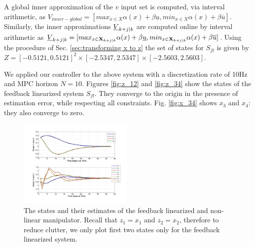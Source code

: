 A global inner approximation of the $v$ input set is computed, via interval arithmetic, as $V_{inner-global} = [max_{x\in X}\alpha(x) + \beta \underline{u}, min_{x\in X}\alpha(x) + \beta \overline{u}]$. 
Similarly, the inner approximations $\underline{V}_{k+j|k}$ are computed online by interval arithmetic as $\underline{V}_{k+j|k} = [max_{x\in \mathbf{X}_{k+j|k}} \alpha(x) + \beta \underline{u},  min_{x\in \mathbf{X}_{k+j|k}}\alpha(x) + \beta \overline{u}]$. 
Using the procedure of Sec. \ref{sec:transforming x to z} the set of states for $S_{fl}$ is given by $Z = [-0.5121, 0.5121]^2 \times [-2.5347, 2.5347] \times [-2.5603, 2.5603]$.

We applied our controller to the above system with a discretization rate of 10Hz and MPC horizon $N=10$.
Figures \ref{fig:z_12} and \ref{fig:z_34} show the states of the feedback linearized system $S_{fl}$. 
They converge to the origin in the presence of estimation error, while respecting all constraints.
Fig. \ref{fig:x_34} shows $x_3$ and $x_4$: they also converge to zero.

\begin{figure}
\includegraphics[width=0.49\textwidth]{figs/AllStates_manip.pdf}
\caption{The states and their estimates of the feedback linearized and non-linear manipulator. Recall that $z_1 = x_1$ and $z_2=x_2$, therefore to reduce clutter, we only plot first two states only for the feedback linearized system.}
\label{fig:states_manip}
\end{figure}




